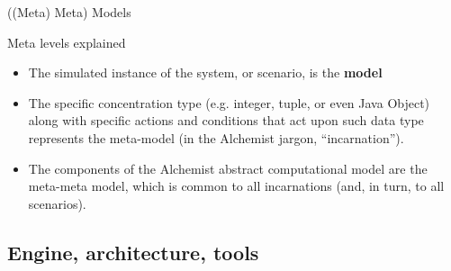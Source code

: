 \documentclass[presentation]{beamer}\mode<presentation>{\usetheme{sapere}}
\begin{document}

\begin{frame}{((Meta) Meta) Models}
\begin{block}{Meta levels explained}
\begin{itemize}
 \item The simulated instance of the system, or scenario, is the \textbf{model}
 \item The specific concentration type (e.g. integer, tuple, or even Java Object) along with specific actions and conditions that act upon such data type represents the meta-model (in the Alchemist jargon, ``incarnation'').
 \item The components of the Alchemist abstract computational model are the meta-meta model, which is common to all incarnations (and, in turn, to all scenarios).
\end{itemize}
\end{block}
\end{frame}

\subsection{Engine, architecture, tools}
\end{document}
